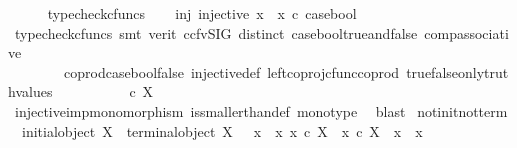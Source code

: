 \begin{isabellebody}
\ \ \ \ \isamarkupfalse%
\ typecheck{\isacharunderscore}{\kern0pt}cfuncs\isanewline
\ \ \isamarkupfalse%
\ inj{\isacharcolon}{\kern0pt}\ {\isachardoublequoteopen}injective\ {\isacharparenleft}{\kern0pt}{\isacharparenleft}{\kern0pt}x{}\ {\isasymamalg}\ x{}{\isacharparenright}{\kern0pt}\ {\isasymcirc}\isactrlsub c\ case{\isacharunderscore}{\kern0pt}bool{\isacharparenright}{\kern0pt}{\isachardoublequoteclose}\isanewline
\ \ \ \ \isamarkupfalse%
\ {\isacharparenleft}{\kern0pt}typecheck{\isacharunderscore}{\kern0pt}cfuncs{\isacharcomma}{\kern0pt}\ smt\ {\isacharparenleft}{\kern0pt}verit{\isacharcomma}{\kern0pt}\ ccfv{\isacharunderscore}{\kern0pt}SIG{\isacharparenright}{\kern0pt}\ distinct\ case{\isacharunderscore}{\kern0pt}bool{\isacharunderscore}{\kern0pt}true{\isacharunderscore}{\kern0pt}and{\isacharunderscore}{\kern0pt}false\ comp{\isacharunderscore}{\kern0pt}associative{}\ \isanewline
\ \ \ \ \ \ \ \ coprod{\isacharunderscore}{\kern0pt}case{\isacharunderscore}{\kern0pt}bool{\isacharunderscore}{\kern0pt}false\ injective{\isacharunderscore}{\kern0pt}def{}\ left{\isacharunderscore}{\kern0pt}coproj{\isacharunderscore}{\kern0pt}cfunc{\isacharunderscore}{\kern0pt}coprod\ true{\isacharunderscore}{\kern0pt}false{\isacharunderscore}{\kern0pt}only{\isacharunderscore}{\kern0pt}truth{\isacharunderscore}{\kern0pt}values{\isacharparenright}{\kern0pt}\ \ \ \ \isanewline
\ \ \isamarkupfalse%
\ \isamarkupfalse%
\ {\isachardoublequoteopen}{\isasymOmega}\ {\isasymle}\isactrlsub c\ X{\isachardoublequoteclose}\isanewline
\ \ \ \ \isamarkupfalse%
\ injective{\isacharunderscore}{\kern0pt}imp{\isacharunderscore}{\kern0pt}monomorphism\ is{\isacharunderscore}{\kern0pt}smaller{\isacharunderscore}{\kern0pt}than{\isacharunderscore}{\kern0pt}def\ mono{\isacharunderscore}{\kern0pt}type\ \isamarkupfalse%
\ blast\isanewline
{}\isamarkupfalse%
%
\endisatagproof
{\isafoldproof}%
%
\isadelimproof
\isanewline
%
\endisadelimproof
\isanewline
{}\isamarkupfalse%
\ not{\isacharunderscore}{\kern0pt}init{\isacharunderscore}{\kern0pt}not{\isacharunderscore}{\kern0pt}term{\isacharcolon}{\kern0pt}\isanewline
\ \ {\isachardoublequoteopen}{\isacharparenleft}{\kern0pt}{\isasymnot}{\isacharparenleft}{\kern0pt}initial{\isacharunderscore}{\kern0pt}object\ X{\isacharparenright}{\kern0pt}\ {\isasymand}\ {\isasymnot}{\isacharparenleft}{\kern0pt}terminal{\isacharunderscore}{\kern0pt}object\ X{\isacharparenright}{\kern0pt}{\isacharparenright}{\kern0pt}\ {\isacharequal}{\kern0pt}\ {\isacharparenleft}{\kern0pt}{\isasymexists}\ x{}{\isachardot}{\kern0pt}\ {\isasymexists}\ x{}{\isachardot}{\kern0pt}\ x{}\ {\isasymin}\isactrlsub c\ X\ {\isasymand}\ x{}\ {\isasymin}\isactrlsub c\ X\ {\isasymand}\ x{}\ {\isasymnoteq}\ x{}{\isacharparenright}{\kern0pt}{\isachardoublequoteclose}\isanewline

\end{isabellebody}
